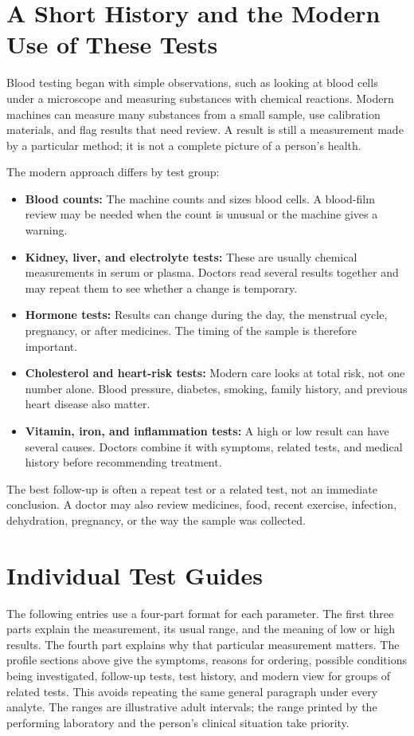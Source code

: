 \documentclass[11pt,openany]{book}
\begin{document}
\section{A Short History and the Modern Use of These Tests}

Blood testing began with simple observations, such as looking at blood cells
under a microscope and measuring substances with chemical reactions. Modern
machines can measure many substances from a small sample, use calibration
materials, and flag results that need review. A result is still a measurement
made by a particular method; it is not a complete picture of a person's health.

The modern approach differs by test group:

\begin{itemize}[leftmargin=*]
  \item \textbf{Blood counts:} The machine counts and sizes blood cells. A
  blood-film review may be needed when the count is unusual or the machine
  gives a warning.
  \item \textbf{Kidney, liver, and electrolyte tests:} These are usually
  chemical measurements in serum or plasma. Doctors read several results
  together and may repeat them to see whether a change is temporary.
  \item \textbf{Hormone tests:} Results can change during the day, the
  menstrual cycle, pregnancy, or after medicines. The timing of the sample is
  therefore important.
  \item \textbf{Cholesterol and heart-risk tests:} Modern care looks at total
  risk, not one number alone. Blood pressure, diabetes, smoking, family history,
  and previous heart disease also matter.
  \item \textbf{Vitamin, iron, and inflammation tests:} A high or low result
  can have several causes. Doctors combine it with symptoms, related tests, and
  medical history before recommending treatment.
\end{itemize}

The best follow-up is often a repeat test or a related test, not an immediate
conclusion. A doctor may also review medicines, food, recent exercise,
infection, dehydration, pregnancy, or the way the sample was collected.

\section{Individual Test Guides}

The following entries use a four-part format for each parameter. The first
three parts explain the measurement, its usual range, and the meaning of low or
high results. The fourth part explains why that particular measurement matters.
The profile sections above give the symptoms, reasons for ordering, possible
conditions being investigated, follow-up tests, test history, and modern view
for groups of related tests. This avoids repeating the same general paragraph
under every analyte. The ranges are illustrative adult intervals; the range
printed by the performing laboratory and the person's clinical situation take
priority.
\end{document}

